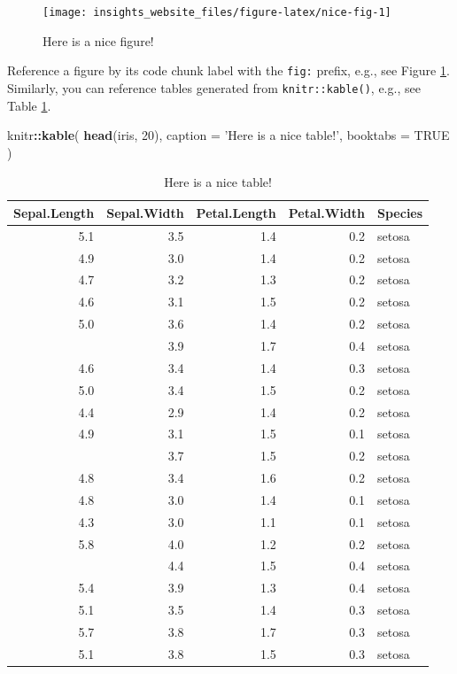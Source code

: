 \documentclass[]{book}
\newenvironment{Shaded}{\begin{snugshade}}{\end{snugshade}}
\newcommand{\DataTypeTok}[1]{\textcolor[rgb]{0.13,0.29,0.53}{#1}}
\newcommand{\DecValTok}[1]{\textcolor[rgb]{0.00,0.00,0.81}{#1}}
\newcommand{\KeywordTok}[1]{\textcolor[rgb]{0.13,0.29,0.53}{\textbf{#1}}}
\newcommand{\NormalTok}[1]{#1}
\newcommand{\OperatorTok}[1]{\textcolor[rgb]{0.81,0.36,0.00}{\textbf{#1}}}
\newcommand{\OtherTok}[1]{\textcolor[rgb]{0.56,0.35,0.01}{#1}}
\newcommand{\StringTok}[1]{\textcolor[rgb]{0.31,0.60,0.02}{#1}}
\begin{document}
\begin{figure}

{\centering \texttt{[image: insights\_website\_files/figure-latex/nice-fig-1]} 

}

\caption{Here is a nice figure!}\label{fig:nice-fig}
\end{figure}

Reference a figure by its code chunk label with the \texttt{fig:} prefix, e.g., see Figure \ref{fig:nice-fig}. Similarly, you can reference tables generated from \texttt{knitr::kable()}, e.g., see Table \ref{tab:nice-tab}.

\begin{Shaded}
\begin{Highlighting}[]
\NormalTok{knitr}\OperatorTok{::}\KeywordTok{kable}\NormalTok{(}
  \KeywordTok{head}\NormalTok{(iris, }\DecValTok{20}\NormalTok{), }\DataTypeTok{caption =} \StringTok{'Here is a nice table!'}\NormalTok{,}
  \DataTypeTok{booktabs =} \OtherTok{TRUE}
\NormalTok{)}
\end{Highlighting}
\end{Shaded}

\begin{table}[t]

\caption{\label{tab:nice-tab}Here is a nice table!}
\centering
\begin{tabular}{rrrrl}
\toprule
Sepal.Length & Sepal.Width & Petal.Length & Petal.Width & Species\\
\midrule
5.1 & 3.5 & 1.4 & 0.2 & setosa\\
4.9 & 3.0 & 1.4 & 0.2 & setosa\\
4.7 & 3.2 & 1.3 & 0.2 & setosa\\
4.6 & 3.1 & 1.5 & 0.2 & setosa\\
5.0 & 3.6 & 1.4 & 0.2 & setosa\\
\addlinespace
5.4 & 3.9 & 1.7 & 0.4 & setosa\\
4.6 & 3.4 & 1.4 & 0.3 & setosa\\
5.0 & 3.4 & 1.5 & 0.2 & setosa\\
4.4 & 2.9 & 1.4 & 0.2 & setosa\\
4.9 & 3.1 & 1.5 & 0.1 & setosa\\
\addlinespace
5.4 & 3.7 & 1.5 & 0.2 & setosa\\
4.8 & 3.4 & 1.6 & 0.2 & setosa\\
4.8 & 3.0 & 1.4 & 0.1 & setosa\\
4.3 & 3.0 & 1.1 & 0.1 & setosa\\
5.8 & 4.0 & 1.2 & 0.2 & setosa\\
\addlinespace
5.7 & 4.4 & 1.5 & 0.4 & setosa\\
5.4 & 3.9 & 1.3 & 0.4 & setosa\\
5.1 & 3.5 & 1.4 & 0.3 & setosa\\
5.7 & 3.8 & 1.7 & 0.3 & setosa\\
5.1 & 3.8 & 1.5 & 0.3 & setosa\\
\bottomrule
\end{tabular}
\end{table}
\end{document}
